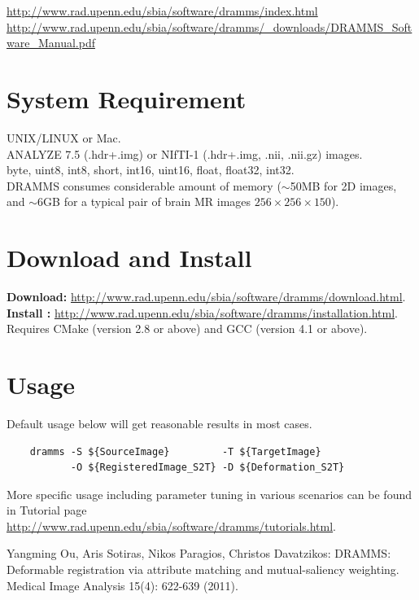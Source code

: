 \documentclass[a4paper,12pt]{article}
\begin{document}
 \url{http://www.rad.upenn.edu/sbia/software/dramms/index.html} \\
 \url{http://www.rad.upenn.edu/sbia/software/dramms/_downloads/DRAMMS_Software_Manual.pdf} 



\section{System Requirement}  
\label{System}  

 UNIX/LINUX or Mac. \\
 ANALYZE 7.5 (.hdr+.img) or NIfTI-1 (.hdr+.img, .nii, .nii.gz) images. \\
 byte, uint8, int8, short, int16, uint16, float, float32, int32. \\
 DRAMMS consumes considerable amount of memory ($\sim$50MB for 2D images, and $\sim$6GB for a typical pair of brain MR images $256\times256\times150$). \\


\section{Download and Install}
\label{install}

{\bf{Download:}} \url{http://www.rad.upenn.edu/sbia/software/dramms/download.html}. \\
{\bf{Install :}} \url{http://www.rad.upenn.edu/sbia/software/dramms/installation.html}. Requires CMake (version 2.8 or above) and GCC (version 4.1 or above).




\section{Usage}
\label{usage}
Default usage below will get reasonable results in most cases. 
\begin{verbatim}
    dramms -S ${SourceImage}         -T ${TargetImage} 
           -O ${RegisteredImage_S2T} -D ${Deformation_S2T} 
\end{verbatim}
More specific usage including parameter tuning in various scenarios can be found in Tutorial page \url{http://www.rad.upenn.edu/sbia/software/dramms/tutorials.html}.





\begin{thebibliography}{4}

 Yangming Ou, Aris Sotiras, Nikos Paragios, Christos Davatzikos: DRAMMS: Deformable registration via attribute matching and mutual-saliency weighting. Medical Image Analysis 15(4): 622-639 (2011).


\end{thebibliography}




\end{document}
